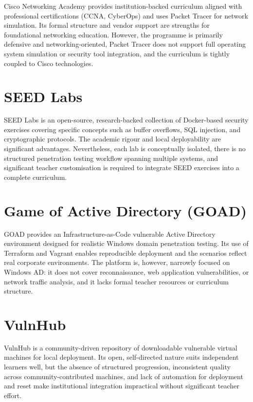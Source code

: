 Cisco Networking Academy \cite{cisco_netacad} provides institution-backed curriculum aligned with
professional certifications (CCNA, CyberOps) and uses Packet Tracer for network simulation.
Its formal structure and vendor support are strengths for foundational networking education.
However, the programme is primarily defensive and networking-oriented, Packet Tracer does not
support full operating system simulation or security tool integration, and the curriculum is
tightly coupled to Cisco technologies.

\section{SEED Labs}

SEED Labs \cite{seedlabs} is an open-source, research-backed collection of Docker-based security
exercises covering specific concepts such as buffer overflows, SQL injection, and cryptographic
protocols. The academic rigour and local deployability are significant advantages. Nevertheless,
each lab is conceptually isolated, there is no structured penetration testing workflow spanning
multiple systems, and significant teacher customisation is required to integrate SEED exercises
into a complete curriculum.

\section{Game of Active Directory (GOAD)}

GOAD \cite{goad} provides an Infrastructure-as-Code vulnerable Active Directory environment
designed for realistic Windows domain penetration testing. Its use of Terraform and Vagrant enables
reproducible deployment and the scenarios reflect real corporate environments. The platform is,
however, narrowly focused on Windows AD: it does not cover reconnaissance, web application
vulnerabilities, or network traffic analysis, and it lacks formal teacher resources or
curriculum structure.

\section{VulnHub}

VulnHub \cite{vulnhub} is a community-driven repository of downloadable vulnerable virtual machines
for local deployment. Its open, self-directed nature suits independent learners well, but the
absence of structured progression, inconsistent quality across community-contributed machines,
and lack of automation for deployment and reset make institutional integration impractical
without significant teacher effort.

